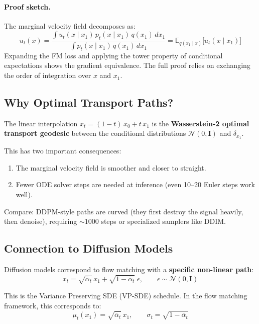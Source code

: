 \documentclass[11pt, a4paper]{article}
\newcommand{\alphabar}{\bar{\alpha}}
\newcommand{\E}{\mathbb{E}}
\newcommand{\N}{\mathcal{N}}
\newcommand{\Id}{\mathbf{I}}
\begin{document}
\paragraph{Proof sketch.}
The marginal velocity field decomposes as:
\[
  u_t(x) = \frac{\int u_t(x \mid x_1)\, p_t(x \mid x_1)\, q(x_1)\, dx_1}
                 {\int p_t(x \mid x_1)\, q(x_1)\, dx_1}
         = \E_{q(x_1 \mid x)}\bigl[u_t(x \mid x_1)\bigr]
\]
Expanding the FM loss and applying the tower property of conditional
expectations shows the gradient equivalence.  The full proof relies on
exchanging the order of integration over $x$ and $x_1$.

\subsection{Why Optimal Transport Paths?}

The linear interpolation $x_t = (1-t)\,x_0 + t\,x_1$ is the
\textbf{Wasserstein-2 optimal transport geodesic} between the conditional
distributions $\N(0,\Id)$ and $\delta_{x_1}$.

This has two important consequences:
\begin{enumerate}
  \item The marginal velocity field is smoother and closer to straight.
  \item Fewer ODE solver steps are needed at inference (even 10--20 Euler steps
        work well).
\end{enumerate}

Compare: DDPM-style paths are curved (they first destroy the signal heavily,
then denoise), requiring ${\sim}1000$ steps or specialized samplers like DDIM.

\subsection{Connection to Diffusion Models}

Diffusion models correspond to flow matching with a \textbf{specific non-linear
path}:
\begin{equation}
  \label{eq:vp-path}
  x_t = \sqrt{\alphabar_t}\, x_1 + \sqrt{1 - \alphabar_t}\;\epsilon,
  \qquad \epsilon \sim \N(0, \Id)
\end{equation}

This is the Variance Preserving SDE (VP-SDE) schedule.  In the flow matching
framework, this corresponds to:
\[
  \mu_t(x_1) = \sqrt{\alphabar_t}\, x_1,
  \qquad
  \sigma_t = \sqrt{1 - \alphabar_t}
\]
\end{document}
